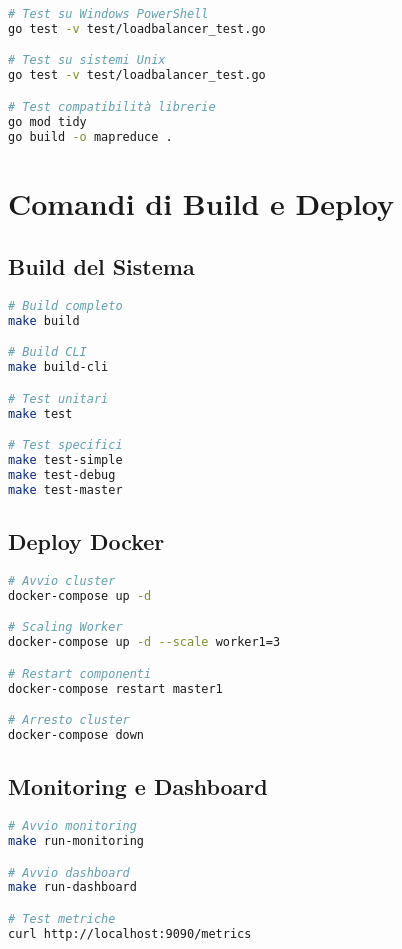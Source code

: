 \documentclass[12pt,a4paper]{article}
\begin{document}
\begin{lstlisting}[language=bash]
# Test su Windows PowerShell
go test -v test/loadbalancer_test.go

# Test su sistemi Unix
go test -v test/loadbalancer_test.go

# Test compatibilità librerie
go mod tidy
go build -o mapreduce .
\end{lstlisting}

\section{Comandi di Build e Deploy}

\subsection{Build del Sistema}

\begin{lstlisting}[language=bash]
# Build completo
make build

# Build CLI
make build-cli

# Test unitari
make test

# Test specifici
make test-simple
make test-debug
make test-master
\end{lstlisting}

\subsection{Deploy Docker}

\begin{lstlisting}[language=bash]
# Avvio cluster
docker-compose up -d

# Scaling Worker
docker-compose up -d --scale worker1=3

# Restart componenti
docker-compose restart master1

# Arresto cluster
docker-compose down
\end{lstlisting}

\subsection{Monitoring e Dashboard}

\begin{lstlisting}[language=bash]
# Avvio monitoring
make run-monitoring

# Avvio dashboard
make run-dashboard

# Test metriche
curl http://localhost:9090/metrics
\end{lstlisting}
\end{document}
